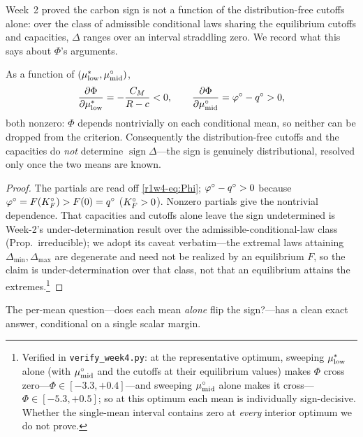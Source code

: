 Week~2 proved the carbon sign is not a function of the distribution-free cutoffs
alone: over the class of admissible conditional laws sharing the equilibrium cutoffs and
capacities, $\Delta$ ranges over an interval straddling zero. We record what this says
about $\Phi$'s arguments.

\begin{proposition}\label{r1w4-thm:minimal}
As a function of $(\mu^{*}_{\mathrm{low}},\mu^{\circ}_{\mathrm{mid}})$,
\[
  \frac{\partial\Phi}{\partial\mu^{*}_{\mathrm{low}}}=-\frac{C_M}{R-c}<0,\qquad
  \frac{\partial\Phi}{\partial\mu^{\circ}_{\mathrm{mid}}}=\varphi^{\circ}-q^{\circ}>0 ,
\]
both nonzero: $\Phi$ depends nontrivially on each conditional mean, so neither can be
dropped from the criterion. Consequently the distribution-free cutoffs and the capacities
do \emph{not} determine $\operatorname{sign}\Delta$---the sign is genuinely
distributional, resolved only once the two means are known.
\end{proposition}

\begin{proof}
The partials are read off \eqref{r1w4-eq:Phi}; $\varphi^{\circ}-q^{\circ}>0$ because $\varphi^{\circ}=F(K_F^{\circ})>F(0)=q^{\circ}$
($K_F^{\circ}>0$). Nonzero partials give the nontrivial dependence. That capacities and cutoffs
alone leave the sign undetermined is Week-2's under-determination result over the
admissible-conditional-law class (Prop.~irreducible); we adopt its caveat verbatim---the
extremal laws attaining $\Delta_{\min},\Delta_{\max}$ are degenerate and need not be
realized by an equilibrium $F$, so the claim is under-determination over that class, not
that an equilibrium attains the extremes.\footnote{Verified in \texttt{verify\_week4.py}:
at the representative optimum, sweeping $\mu^{*}_{\mathrm{low}}$ alone (with $\mu^{\circ}_{\mathrm{mid}}$ and the cutoffs at
their equilibrium values) makes $\Phi$ cross zero---$\Phi\in[-3.3,+0.4]$---and sweeping
$\mu^{\circ}_{\mathrm{mid}}$ alone makes it cross---$\Phi\in[-5.3,+0.5]$; so at this optimum each mean is
individually sign-decisive. Whether the single-mean interval contains zero at
\emph{every} interior optimum we do not prove.}
\end{proof}

The per-mean question---does each mean \emph{alone} flip the sign?---has a clean exact
answer, conditional on a single scalar margin.

